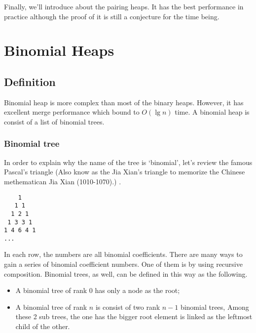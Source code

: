 \documentclass{article}
\begin{document}
Finally, we'll introduce about the pairing heaps. It has the best performance in practice although the proof of it is still a conjecture for the time
being.


\section{Binomial Heaps}
\label{binomail-heap} 


\subsection{Definition}

Binomial heap is more complex than most of the binary heaps. However,
it has excellent merge performance which bound to $O(\lg n)$ time. A
binomial heap is consist of a list of binomial trees.

\subsubsection{Binomial tree}
\label{Binomial tree} 

In order to explain why the name of the tree is `binomial', let's review
the famous Pascal's triangle (Also know as the Jia Xian's triangle to
memorize the Chinese methematican Jia Xian (1010-1070).)
\cite{wiki-pascal-triangle}.

\begin{verbatim}
    1
   1 1
  1 2 1
 1 3 3 1
1 4 6 4 1
...
\end{verbatim}

In each row, the numbers are all binomial coefficients. There are many
ways to gain a series of binomial coefficient numbers. One of them is
by using recursive composition. Binomial trees, as well, can be defined
in this way as the following.

\begin{itemize}
\item A binomial tree of rank 0 has only a node as the root;
\item A binomial tree of rank $n$ is consist of two rank $n-1$ binomial trees,
Among these 2 sub trees, the one has the bigger root element is linked as the
leftmost child of the other.
\end{itemize}
\end{document}
